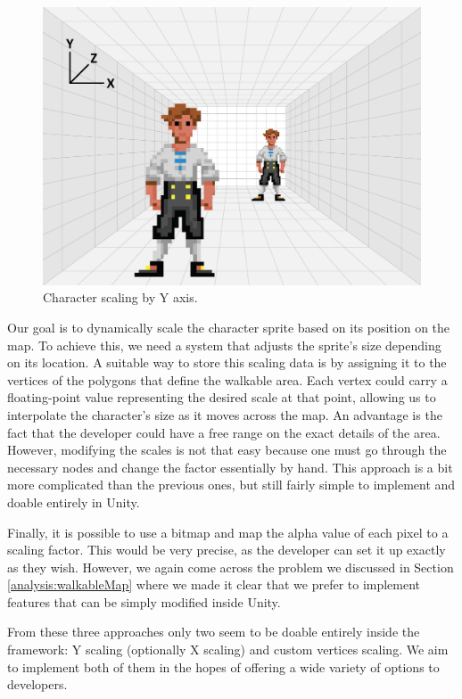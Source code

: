 \begin{figure}[H]
\centering
\includegraphics[width=.6\linewidth]{img/room.png}
\caption{Character scaling by Y axis.}
\label{fig:Room}
\end{figure}

Our goal is to dynamically scale the character sprite based on its position on the map. To achieve this, we need a system that adjusts the sprite’s size depending on its location. A suitable way to store this scaling data is by assigning it to the vertices of the polygons that define the walkable area. Each vertex could carry a floating-point value representing the desired scale at that point, allowing us to interpolate the character's size as it moves across the map.  An advantage is the fact that the developer could have a free range on the exact details of the area. However, modifying the scales is not that easy because one must go through the necessary nodes and change the factor essentially by hand. This approach is a bit more complicated than the previous ones, but still fairly simple to implement and doable entirely in Unity.

Finally, it is possible to use a bitmap and map the alpha value of each pixel to a scaling factor. This would be very precise, as the developer can set it up exactly as they wish. However, we again come across the problem we discussed in Section \ref{analysis:walkableMap} where we made it clear that we prefer to implement features that can be simply modified inside Unity.

From these three approaches only two seem to be doable entirely inside the framework: Y scaling (optionally X scaling) and custom vertices scaling. We aim to implement both of them in the hopes of offering a wide variety of options to developers.

